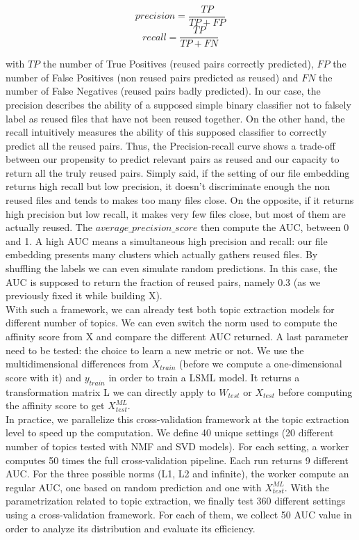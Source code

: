 \documentclass[a4paper]{article}
\begin{document}
	\[
	precision = \frac{TP}{TP + FP}
	\]
	\[
	recall = \frac{TP}{TP + FN}
	\]
	
	with $TP$ the number of True Positives (reused pairs correctly predicted), $FP$ the number of False Positives (non reused pairs predicted as reused) and $FN$ the number of False Negatives (reused pairs badly predicted). In our case, the precision describes the ability of a supposed simple binary classifier not to falsely label as reused files that have not been reused together. On the other hand, the recall intuitively measures the ability of this supposed classifier to correctly predict all the reused pairs. Thus, the Precision-recall curve shows a trade-off between our propensity to predict relevant pairs as reused and our capacity to return all the truly reused pairs. Simply said, if the setting of our file embedding returns high recall but low precision, it doesn't discriminate enough the non reused files and tends to makes too many files close. On the opposite, if it returns high precision but low recall, it makes very few files close, but most of them are actually reused. The \emph{$average\_precision\_score$} then compute the \ac{AUC}, between 0 and 1. A high \ac{AUC} means a simultaneous high precision and recall: our file embedding presents many clusters which actually gathers reused files. By shuffling the labels we can even simulate random predictions. In this case, the \ac{AUC} is supposed to return the fraction of reused pairs, namely 0.3 (as we previously fixed it while building X).\\
		
	With such a framework, we can already test both topic extraction models for different number of topics. We can even switch the norm used to compute the affinity score from X and compare the different \ac{AUC} returned. A last parameter need to be tested: the choice to learn a new metric or not. We use the multidimensional differences from $X_{train}$ (before we compute a one-dimensional score with it) and $y_{train}$ in order to train a \ac{LSML} model. It returns a transformation matrix L we can directly apply to $W_{test}$ or $X_{test}$ before computing the affinity score to get $X_{test}^{ML}$.\\
	
	In practice, we parallelize this cross-validation framework at the topic extraction level to speed up the computation. We define 40 unique settings (20 different number of topics tested with \ac{NMF} and \ac{SVD} models). For each setting, a worker computes 50 times the full cross-validation pipeline. Each run returns 9 different \ac{AUC}. For the three possible norms (L1, L2 and infinite), the worker compute an regular \ac{AUC}, one based on random prediction and one with $X_{test}^{ML}$. With the parametrization related to topic extraction, we finally test 360 different settings using a cross-validation framework. For each of them, we collect 50 \ac{AUC} value in order to analyze its distribution and evaluate its efficiency.
	
\end{document}
